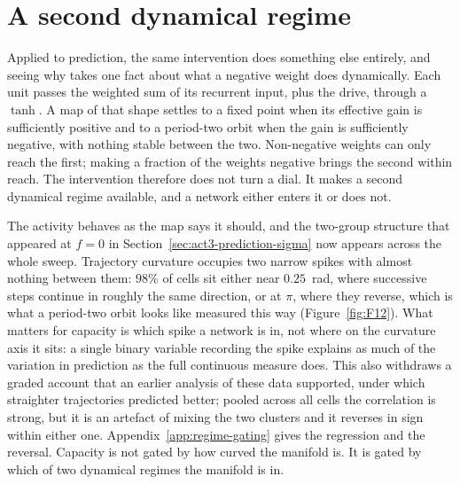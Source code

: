 \section{A second dynamical regime}
\label{sec:act3-branch}
\bigskip

Applied to prediction, the same intervention does something else entirely, and
seeing why takes one fact about what a negative weight does dynamically. Each
unit passes the weighted sum of its recurrent input, plus the drive, through a
$\tanh$. A map of that shape settles to a fixed point when its effective gain is
sufficiently positive and to a period-two orbit when the gain is sufficiently
negative, with nothing stable between the two. Non-negative weights can only
reach the first; making a fraction of the weights negative brings the second
within reach. The intervention therefore does not turn a dial. It makes a second
dynamical regime available, and a network either enters it or does not.

The activity behaves as the map says it should, and the two-group structure that
appeared at $f = 0$ in Section~\ref{sec:act3-prediction-sigma} now appears across
the whole sweep. Trajectory curvature occupies two narrow spikes with almost
nothing between them:
$98\%$ %
of cells sit either near
$0.25$~rad, %
where successive steps continue in roughly the same direction, or at
$\pi$, %
where they reverse, which is what a period-two orbit looks like measured this way
(Figure~\ref{fig:F12}). What matters for capacity is which spike a network is
in, not where on the curvature axis it sits: a single binary variable recording
the spike explains as much of the variation in prediction as the full continuous
measure does. This also withdraws a graded account that an earlier analysis of
these data supported, under which straighter trajectories predicted better;
pooled across all
cells the correlation is strong, but it is an artefact of mixing the two clusters
and it reverses in sign within either one.
Appendix~\ref{app:regime-gating} gives the regression and the reversal. Capacity
is not gated by how curved the manifold is. It is gated by which of two dynamical
regimes the manifold is in.


